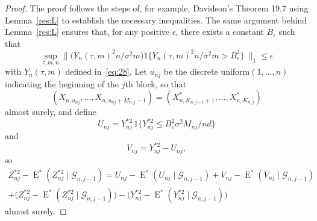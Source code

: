 \documentclass[11pt]{article}
\theoremstyle{definition}
\DeclareMathOperator{\E}{E}
\begin{document}
\begin{proof}
  The proof follows the steps of, for example, Davidson's Theorem 19.7
  using Lemma~\ref{res:L} to establish the necessary inequalities.
  The same argument behind Lemma~\ref{res:L} ensures that, for any
  positive $\epsilon$, there exists a constant $B_{\epsilon}$ such
  that
  \begin{equation}
    \label{eq:21}
    \sup_{\tau, m, n} \big\| \big(Y_n(\tau,m)^2 n / \sigma^2 m \big)
    1\{Y_n(\tau,m)^2 n/ \sigma^2 m  > B_{\epsilon}^2\}\ \big\|_1 \leq \epsilon
  \end{equation}
  with $Y_n(\tau, m)$ defined in~\eqref{eq:28}.  Let $u_{nj}$ be the
  discrete uniform$(1,\dots,n)$ indicating the beginning of the $j$th
  block, so that
  \begin{equation*}
    (X_{n,u_{nj}},\dots,X_{n,u_{nj} + M_{n,j} - 1}) = (X_{n,K_{n,j-1}+1}^{*},\dots,X_{n,K_{n,j}}^{*})
  \end{equation*}
  almost surely, and define
  \begin{equation*}
    U_{nj} = Y_{nj}^{*2} \, 1\{Y_{nj}^{*2} \leq B_{\epsilon}^2 \sigma^2 M_{nj} / n d \}
  \end{equation*}
  and
  \begin{equation*}
    V_{nj} = Y_{nj}^{*2} - U_{nj},
  \end{equation*}
  so
  \begin{multline*}
    Z_{nj}^{*2} - \E^{*}(Z_{nj}^{*2} \mid \mathcal{G}_{n,j-1}) 
    = U_{nj} - \E^{*}(U_{nj} \mid \mathcal{G}_{n,j-1}) + V_{nj} - \E^{*}(V_{nj} \mid \mathcal{G}_{n,j-1}) \\ 
    + \big(Z_{nj}^{*2} - \E^{*}(Z_{nj}^{*2} \mid \mathcal{G}_{n,j-1})\big) - \big(Y_{nj}^{*2} - \E^{*}(Y_{nj}^{*2} \mid \mathcal{G}_{n,j-1})\big)
  \end{multline*}
  almost surely.


\end{proof}
\end{document}
